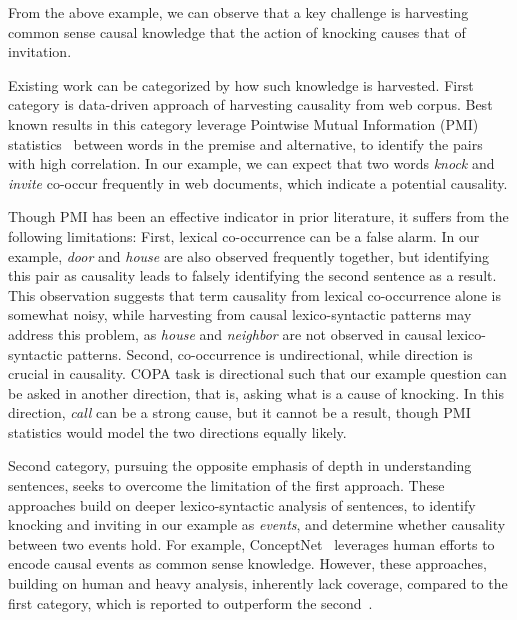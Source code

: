 From the above example, we can observe that a key challenge is
harvesting common sense causal knowledge
that the action of knocking causes that of invitation.

Existing work can be categorized by how such knowledge is harvested.
First category is data-driven approach of harvesting causality from web corpus.
Best known results in this category leverage
Pointwise Mutual Information (PMI) statistics~\cite{Mihalcea2006:CKM}
between words in the premise and alternative, to identify the pairs with
high correlation.
In our example, we can expect that two words \emph{knock} and \emph{invite}
co-occur frequently in web documents, which indicate a potential causality.

Though PMI has been an effective indicator in prior literature, it
suffers from the following limitations: First, lexical co-occurrence
can be a false alarm. In our example, \emph{door} and \emph{house}
are also observed frequently together, but identifying this pair as
causality leads to falsely identifying the second sentence as a
result. This observation suggests that term causality from lexical
co-occurrence alone is somewhat noisy, while harvesting from causal
lexico-syntactic patterns may address this problem, as \emph{house}
and \emph{neighbor} are not observed in causal lexico-syntactic
patterns. Second, co-occurrence is undirectional, while direction is
crucial in causality. COPA task is directional such that our example
question can be asked in another direction, that is, asking what is
a cause of knocking. In this direction, \emph{call} can be a strong
cause, but it cannot be a result, though PMI statistics would model
the two directions equally likely.

Second category, pursuing the opposite emphasis of depth in
understanding sentences, seeks to overcome the limitation of
the first approach.
These approaches build on deeper lexico-syntactic analysis of sentences,
to identify knocking and inviting in our example as
\emph{events}, and determine whether causality between two events hold.
For example, ConceptNet~\cite{HavasiSALAM10} leverages human efforts
to encode causal events as common sense knowledge.
However, these approaches, building on human and heavy analysis,
inherently lack coverage, compared to the first category, which is
reported to outperform the second~\cite{gordon2012copa}.

